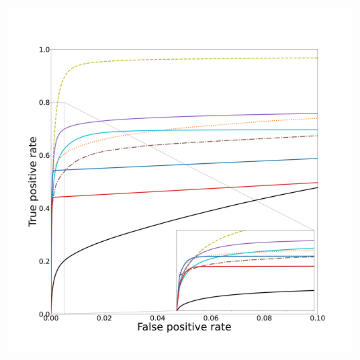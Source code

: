 \begin{figure}[!ht]
  \begin{subfigure}[t]{0.78\textwidth}
    \centering
  \includegraphics[width=\textwidth,clip = true, trim  =  125 125 180 200]{Images/Vascu_2_ROC.pdf}
\end{subfigure}
\begin{subfigure}[t]{0.2\textwidth}

\end{subfigure}
\end{figure}

